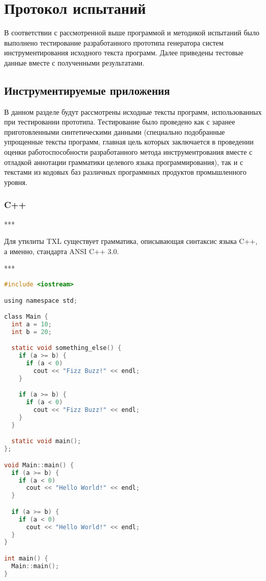 \section{Протокол испытаний}

В соответствии с рассмотренной выше программой и методикой испытаний было выполнено тестирование разработанного прототипа генератора систем инструментирования исходного текста программ.
Далее приведены тестовые данные вместе с полученными результатами.

\subsection{Инструментируемые приложения}

В данном разделе будут рассмотрены исходные тексты программ, использованных при тестировании прототипа.
Тестирование было проведено как с заранее приготовленными синтетическими данными (специально подобранные упрощенные тексты программ, главная цель которых заключается в проведении оценки работоспособности разработанного метода инструментрования вместе с отладкой аннотации грамматики целевого языка программирования), так и с текстами из кодовых баз различных программных продуктов промышленного уровня.

\subsubsection{C++}

***

Для утилиты TXL существует грамматика, описывающая синтаксис языка C++, а именно, стандарта ANSI C++ 3.0.

***

\begin{lstlisting}[frame=single, language=C, label={test-c}, caption={Исходный текст тестового приложения.}]
#include <iostream>

using namespace std;

class Main {
  int a = 10;
  int b = 20;

  static void something_else() {
    if (a >= b) {
      if (a < 0)
        cout << "Fizz Buzz!" << endl;
    }

    if (a >= b) {
      if (a < 0)
        cout << "Fizz Buzz!" << endl;
    }
  }

  static void main();
};

void Main::main() {
  if (a >= b) {
    if (a < 0)
      cout << "Hello World!" << endl;
  }

  if (a >= b) {
    if (a < 0)
      cout << "Hello World!" << endl;
  }
}

int main() {
  Main::main();
}
\end{lstlisting}

